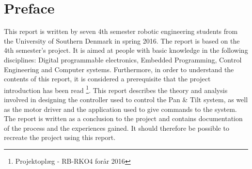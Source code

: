 \section*{Preface}

This report is written by seven 4th semester robotic engineering students from the University of Southern Denmark in spring 2016. The report is based on the 4th semester's project.
It is aimed at people with basic knowledge in the following disciplines: Digital programmable electronics, Embedded Programming, Control Engineering and Computer systems. Furthermore, in order to understand the contents of this report, it is considered a prerequisite that the project introduction has been read \footnote{Projektoplæg - RB-RKO4 forår 2016}.
This report describes the theory and analysis involved in designing the controller used to control the Pan \& Tilt system, as well as the motor driver and the application used to give commands to the system.
The report is written as a conclusion to the project and contains documentation of the process and the experiences gained. It should therefore be possible to recreate the project using this report.